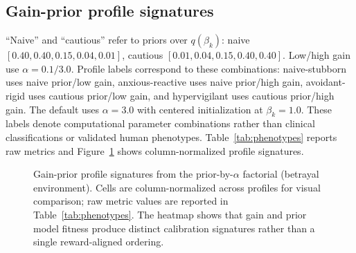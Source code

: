 \subsection{Gain-prior profile signatures}
\label{sec:phenotypes_quadrants}

``Naive'' and ``cautious'' refer to priors over $q(\beta_k)$: naive $[0.40, 0.40, 0.15, 0.04, 0.01]$, cautious $[0.01, 0.04, 0.15, 0.40, 0.40]$. Low/high gain use $\alpha=0.1/3.0$. Profile labels correspond to these combinations: naive-stubborn uses naive prior/low gain, anxious-reactive uses naive prior/high gain, avoidant-rigid uses cautious prior/low gain, and hypervigilant uses cautious prior/high gain. The default uses $\alpha=3.0$ with centered initialization at $\beta_k=1.0$. These labels denote computational parameter combinations rather than clinical classifications or validated human phenotypes. Table~\ref{tab:phenotypes} reports raw metrics and Figure~\ref{fig:phenotype_quadrants_appendix} shows column-normalized profile signatures.

\begin{table}[H]
\centering
\caption{Behavioral metrics by profile (betrayal environment). Default agent shown for reference.}
\label{tab:phenotypes}
\end{table}

\begin{figure}[H]
\centering
{}
\caption{Gain-prior profile signatures from the prior-by-$\alpha$ factorial (betrayal environment). Cells are column-normalized across profiles for visual comparison; raw metric values are reported in Table~\ref{tab:phenotypes}. The heatmap shows that gain and prior model fitness produce distinct calibration signatures rather than a single reward-aligned ordering.}
\label{fig:phenotype_quadrants_appendix}
\end{figure}
\appendixfloattosection

